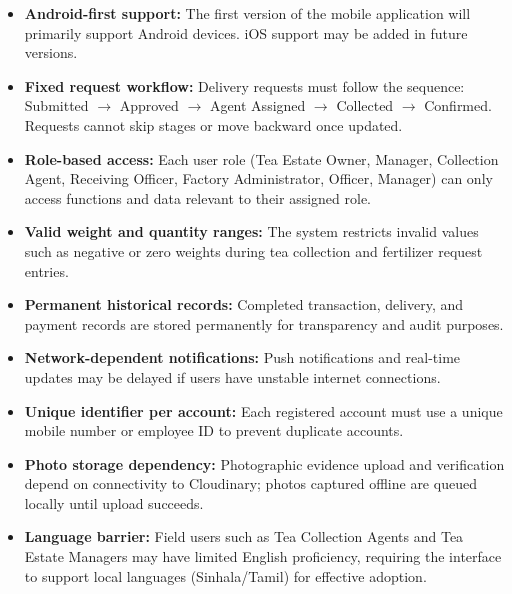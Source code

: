 \begin{itemize}
	\item \textbf{Android-first support:} The first version of the mobile application will primarily support Android devices. iOS support may be added in future versions.
	\item \textbf{Fixed request workflow:} Delivery requests must follow the sequence: Submitted $\rightarrow$ Approved $\rightarrow$ Agent Assigned $\rightarrow$ Collected $\rightarrow$ Confirmed. Requests cannot skip stages or move backward once updated.
	\item \textbf{Role-based access:} Each user role (Tea Estate Owner, Manager, Collection Agent, Receiving Officer, Factory Administrator, Officer, Manager) can only access functions and data relevant to their assigned role.
	\item \textbf{Valid weight and quantity ranges:} The system restricts invalid values such as negative or zero weights during tea collection and fertilizer request entries.
	\item \textbf{Permanent historical records:} Completed transaction, delivery, and payment records are stored permanently for transparency and audit purposes.
	\item \textbf{Network-dependent notifications:} Push notifications and real-time updates may be delayed if users have unstable internet connections.
	\item \textbf{Unique identifier per account:} Each registered account must use a unique mobile number or employee ID to prevent duplicate accounts.
	\item \textbf{Photo storage dependency:} Photographic evidence upload and verification depend on connectivity to Cloudinary; photos captured offline are queued locally until upload succeeds.
	\item \textbf{Language barrier:} Field users such as Tea Collection Agents and Tea Estate Managers may have limited English proficiency, requiring the interface to support local languages (Sinhala/Tamil) for effective adoption.
\end{itemize}

